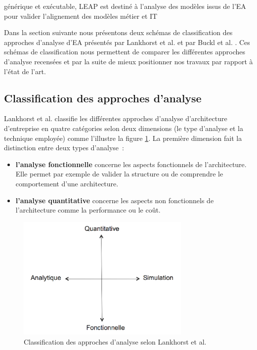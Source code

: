 générique et exécutable, LEAP est destiné à l'analyse des modèles issus de l'EA 
pour valider l'alignement des modèles métier et IT 

Dans la section suivante nous présentons deux schémas de classification des 
approches d'analyse d'EA présentés par Lankhorst et al. 
\cite{lankhorst2013enterprise} et par Buckl et al. \cite{buckl2009classifying}. 
Ces schémas de classification nous permettent de comparer les différentes 
approches d'analyse recensées et par la suite de mieux positionner nos travaux 
par rapport à l'état de l'art.


	\subsection{Classification des approches d'analyse}
Lankhorst et al. \cite{lankhorst2013enterprise} classifie les différentes 
approches d'analyse d'architecture d'entreprise en quatre catégories selon deux 
dimensions (le type d'analyse et la technique employée) comme l'illustre la 
figure \ref{fig:classLankhorst}. La première dimension fait la distinction entre 
deux types d'analyse~:
	\begin{itemize}
		\item \textbf{l'analyse fonctionnelle} concerne les aspects fonctionnels de 
l'architecture. Elle permet par exemple de valider la structure ou de comprendre 
le comportement d'une architecture.
		\item \textbf{l'analyse quantitative} concerne les aspects non fonctionnels de 
l'architecture comme la performance ou le coût. 
\end{itemize}

\begin{figure}[!htbp]
 \begin{center}
 
\includegraphics[width=0.75\textwidth]{figures/images/Chapitre1/dimesionsLankhorts.png}
 \end{center}
 \caption{Classification des approches d'analyse selon Lankhorst et al. 
\protect\cite{lankhorst2013enterprise}}
 \label{fig:classLankhorst}
\end{figure}


